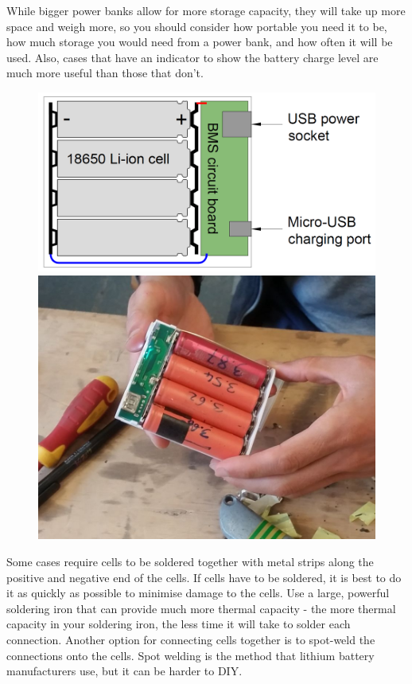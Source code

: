 \documentclass{article}
\theoremstyle{definition}
\theoremstyle{definition}
\theoremstyle{remark}
\begin{document}
  While bigger power banks allow for more storage capacity, they will take up more space and weigh more, so you should consider how portable you need it to be, how much storage you would need from a power bank, and how often it will be used. Also, cases that have an indicator to show the battery charge level are much more useful than those that don’t. 

  \begin{figure}[!ht]
    \centering
    \includegraphics[width=0.35\paperwidth]{Images/image_6_1_(power_bank_diagram).png}
    \includegraphics[width=0.30\paperwidth]{Images/image_6_2_(power_bank).png}
  \end{figure}

  Some cases require cells to be soldered together with metal strips along the positive and negative end of the cells. If cells have to be soldered, it is best to do it as quickly as possible to minimise damage to the cells. Use a large, powerful soldering iron that can provide much more thermal capacity - the more thermal capacity in your soldering iron, the less time it will take to solder each connection. Another option for connecting cells together is to spot-weld the connections onto the cells. Spot welding is the method that lithium battery manufacturers use, but it can be harder to DIY. 
\end{document}
